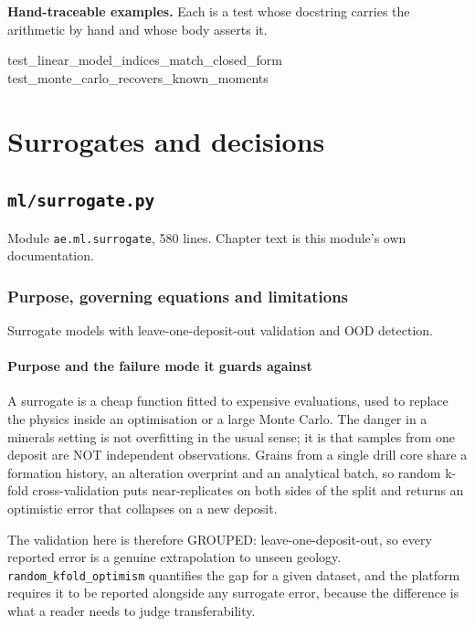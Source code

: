 \documentclass[10pt,a4paper,twoside]{report}
\newcommand{\theblurb}{}
\newcommand{\partblurb}[2]{%
  \renewcommand{\theblurb}{#2}%
  \part{#1}%
  \renewcommand{\theblurb}{}}
\begin{document}
\normalsize

\textbf{Hand-traceable examples.} Each is a test whose docstring carries the arithmetic by hand and whose body asserts it.

\begin{verbatimsmall}
test_linear_model_indices_match_closed_form
test_monte_carlo_recovers_known_moments
\end{verbatimsmall}

\clearpage

\partblurb{Surrogates and decisions}{What may be learned from data, and which measurement to buy next.}

\chapter{\texttt{ml/surrogate.py}}\label{ch:surrogate}


{\footnotesize\color{slate}Module \texttt{ae.ml.surrogate}, 580 lines. Chapter text is this module's own documentation.\par}

\section{Purpose, governing equations and limitations}

Surrogate models with leave-one-deposit-out validation and OOD detection.

\subsection*{Purpose and the failure mode it guards against}

A surrogate is a cheap function fitted to expensive evaluations, used to replace the physics inside an optimisation or a large Monte Carlo. The danger in a minerals setting is not overfitting in the usual sense; it is that samples from one deposit are NOT independent observations. Grains from a single drill core share a formation history, an alteration overprint and an analytical batch, so random k-fold cross-validation puts near-replicates on both sides of the split and returns an optimistic error that collapses on a new deposit.

The validation here is therefore GROUPED: leave-one-deposit-out, so every reported error is a genuine extrapolation to unseen geology. \texttt{random\_kfold\_optimism} quantifies the gap for a given dataset, and the platform requires it to be reported alongside any surrogate error, because the difference is what a reader needs to judge transferability.
\end{document}

